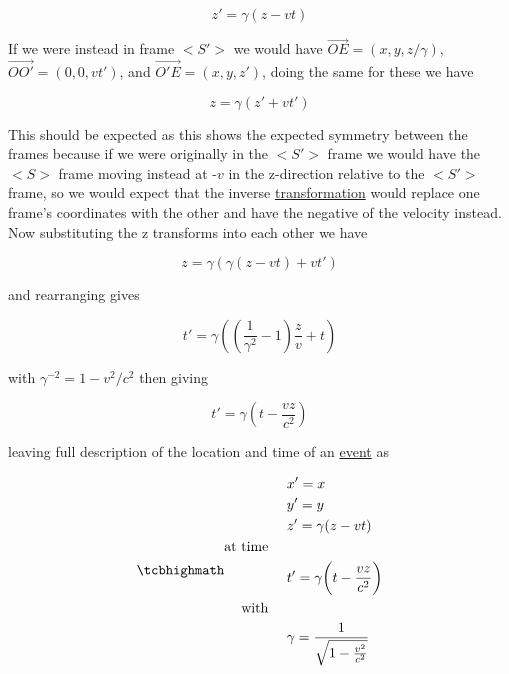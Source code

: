 \begin{equation}
	z{'} = {\gamma} (z-vt)
\end{equation}

If we were instead in frame $<\!\!S'\!\!>$ we would have $\vec{OE}=(x,y,z/{\gamma})$, $\vec{OO'}=(0,0,vt')$, and $\vec{O'E} = (x,y,z')$, doing the same for these we have

\begin{equation}
	z = {\gamma} (z'+vt')
\end{equation}

This should be expected as this shows the expected symmetry between the frames because if we were originally in the $<\!\!S'\!\!>$ frame we would have the $<\!\!S\!>$ frame moving instead at -$v$ in the z-direction relative to the $<\!\!S'\!\!>$ frame, so we would expect that the inverse \hyperlink{def-transform}{transformation} would replace one frame's coordinates with the other and have the negative of the velocity instead.
Now substituting the z transforms into each other we have

\begin{equation}
	z = {\gamma} ( {\gamma} (z-vt)+vt')
\end{equation}

and rearranging gives

\begin{equation}
	t' = {\gamma} \left( \left( \dfrac{1}{{\gamma}^2}-1 \right)\frac{z}{v} + t \right)
\end{equation}

with ${\gamma}^{-2}=1-v^2/c^2$ then giving

\begin{equation}
	t' = {\gamma} \left( t - \dfrac{vz}{c^2} \right)
\end{equation}

leaving full description of the location and time of an \hyperlink{def-event}{event} as

\begin{equation}
	\mhl{
		\begin{aligned}
			 & x'=x                                           \\
			 & y'=y                                           \\
			 & z' = {\gamma} (z-vt)                           \\
			\text{at time \ \ \ }                             \\
			 & t'={\gamma} \bigg(t-\frac{vz}{c^2}\bigg)       \\
			\text{with \ \ \ }                                \\
			 & {\gamma} = \dfrac{1}{\sqrt{1-\frac{v^2}{c^2}}}
		\end{aligned}
	}
	\label{eq: Lorentz transformation}
\end{equation}

